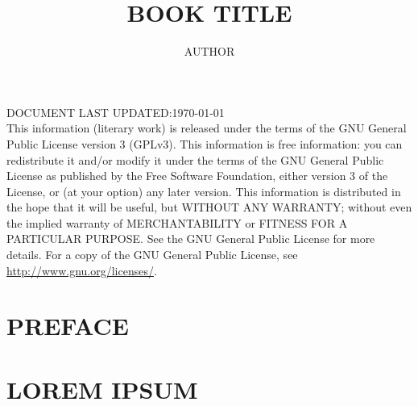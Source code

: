\documentclass[oneside]{book}
\begin{document}
    \pagecolor{yellow!50!orange!40}
    \setlength{\parindent}{0 pt}

\title{\textbf{BOOK TITLE}}
\author{AUTHOR}
\date{}

\thispagestyle{empty}
\maketitle

\thispagestyle{empty}
DOCUMENT LAST UPDATED:\hfill\timeF\today\\

This information (literary work) is released under the terms of the GNU General Public License version 3 (GPLv3). This information is free information: you can redistribute it and/or modify it under the terms of the GNU General Public License as published by the Free Software Foundation, either version 3 of the License, or (at your option) any later version. This information is distributed in the hope that it will be useful, but WITHOUT ANY WARRANTY; without even the implied warranty of MERCHANTABILITY or FITNESS FOR A PARTICULAR PURPOSE. See the GNU General Public License for more details. For a copy of the GNU General Public License, see \url{http://www.gnu.org/licenses/}.
\newpage

    \renewcommand{\cftchapdotsep}{\cftdotsep}
\renewcommand*\contentsname{\Large CONTENTS}
\tableofcontents
\thispagestyle{empty}

    \pagestyle{plain}

\chapter*{PREFACE}

\lipsum[1]

\chapter{LOREM IPSUM}

\lipsum[2-10]
\end{document}
